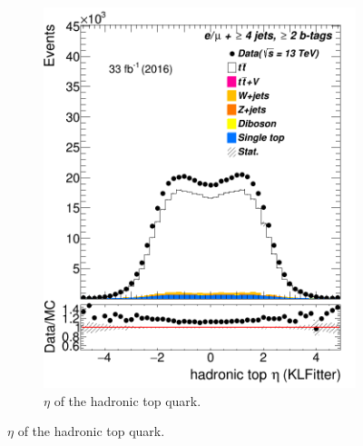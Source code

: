 \begin{figure}
\begin{subfigure}{0.25\textwidth}
	\includegraphics[width=\linewidth]{ControlPlots_emujets_2016_4incl_2incl/klf_topHad_eta_emujets_2016.png}
	\caption{$\eta$ of the hadronic top quark.} \label{fig:K8}
\end{subfigure}




\end{figure}
